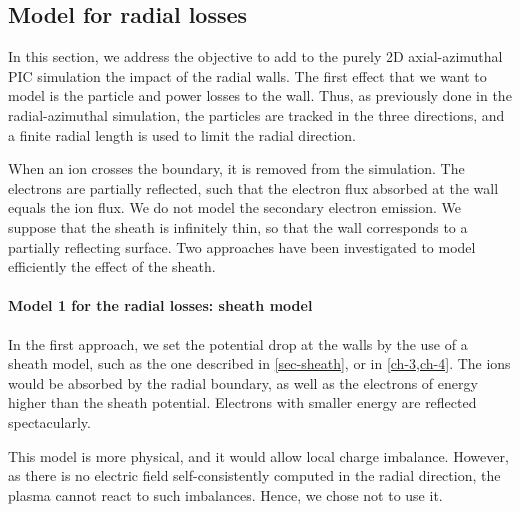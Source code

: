 \subsection{Model for radial losses} \label{subsec-fakeR}

In this section, we address the objective to add to the purely \ac{2D} axial-azimuthal \ac{PIC} simulation the impact of the radial walls.
The first effect that we want to model is the particle and power losses to the wall.
Thus, as previously done in the radial-azimuthal simulation, the particles are tracked in the three directions, and a finite radial length is used to limit the radial direction.

When an ion crosses the boundary, it is removed from the simulation.
The electrons are partially reflected, such that the electron flux absorbed at the wall equals the ion flux.
We do not model the secondary electron emission.
We suppose that the sheath is infinitely thin, so that the wall corresponds to a partially reflecting surface.
Two approaches have been investigated to model efficiently the effect of the sheath.


\paragraph{ Model 1 for the radial losses\string: sheath model\\}
In the first approach, we set the potential drop at the walls by the use of a sheath model, such as the one described in \cref{sec-sheath}, or in \cref{ch-3,ch-4}.
The ions would be absorbed by the radial boundary, as well as the electrons of energy higher than the sheath potential.
Electrons with smaller energy are reflected spectacularly.

This model is more physical, and it would allow local charge imbalance.
However, as there is no electric field self-consistently computed in the radial direction, the plasma cannot react to such imbalances.
Hence, we chose not to use it.


